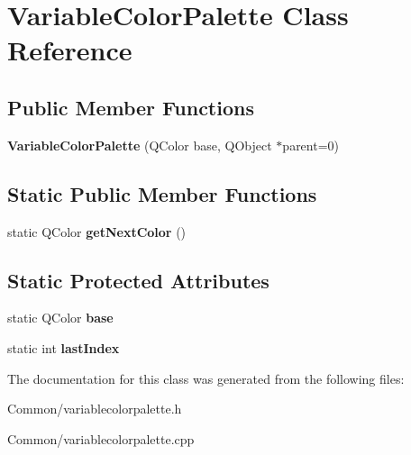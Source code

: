 \hypertarget{class_variable_color_palette}{
\section{\-Variable\-Color\-Palette \-Class \-Reference}
\label{class_variable_color_palette}
}
\subsection*{\-Public \-Member \-Functions}
\begin{DoxyCompactItemize}
\item 
\hypertarget{class_variable_color_palette_a63e95615b76778e5b9a8b411ed4096c2}{
{\bfseries \-Variable\-Color\-Palette} (\-Q\-Color base, \-Q\-Object $\ast$parent=0)}
\label{class_variable_color_palette_a63e95615b76778e5b9a8b411ed4096c2}

\end{DoxyCompactItemize}
\subsection*{\-Static \-Public \-Member \-Functions}
\begin{DoxyCompactItemize}
\item 
\hypertarget{class_variable_color_palette_a532323606e485cc9e3d1ebd8b33a001f}{
static \-Q\-Color {\bfseries get\-Next\-Color} ()}
\label{class_variable_color_palette_a532323606e485cc9e3d1ebd8b33a001f}

\end{DoxyCompactItemize}
\subsection*{\-Static \-Protected \-Attributes}
\begin{DoxyCompactItemize}
\item 
\hypertarget{class_variable_color_palette_a14386482a3e5d85ea9ef970d7a5b9bab}{
static \-Q\-Color {\bfseries base}}
\label{class_variable_color_palette_a14386482a3e5d85ea9ef970d7a5b9bab}

\item 
\hypertarget{class_variable_color_palette_acf75e30264a5521ed6ef5e9dac4c9447}{
static int {\bfseries last\-Index}}
\label{class_variable_color_palette_acf75e30264a5521ed6ef5e9dac4c9447}

\end{DoxyCompactItemize}


\-The documentation for this class was generated from the following files\-:\begin{DoxyCompactItemize}
\item 
\-Common/variablecolorpalette.\-h\item 
\-Common/variablecolorpalette.\-cpp\end{DoxyCompactItemize}

